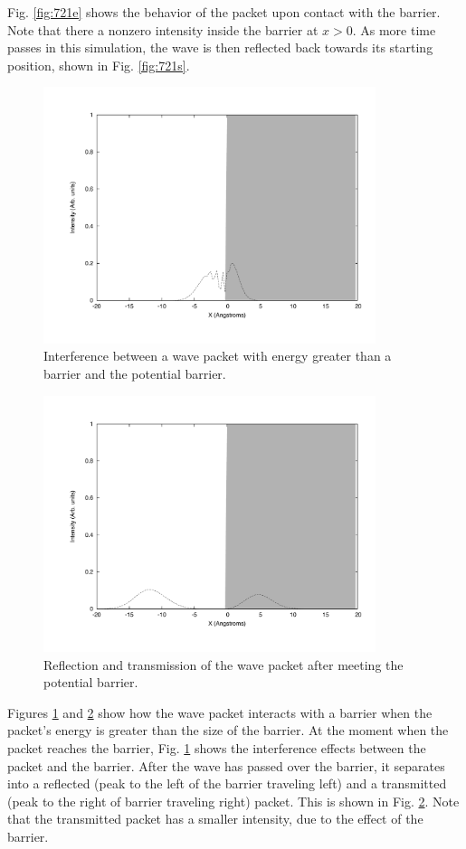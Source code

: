 \documentclass[12pt]{article}
\begin{document}
Fig. \ref{fig:721e} shows the behavior of the packet upon contact with the barrier.  Note that there a nonzero intensity inside the barrier at $x>0$.  As more time passes in this simulation, the wave is then reflected back towards its starting position, shown in Fig. \ref{fig:721s}.

\begin{figure}[!h]
\centering
\includegraphics[width =120 mm, height = 75mm]{Ex_7_23_collis.pdf}
\caption{Interference between a wave packet with energy greater than a barrier and the potential barrier.}
\label{fig:723c}
\end{figure}
\begin{figure}[!h]
\centering
\includegraphics[width =120 mm, height = 75mm]{Ex_7_23_reflec.pdf}
\caption{Reflection and transmission of the wave packet after meeting the potential barrier.}
\label{fig:723r}
\end{figure}

Figures \ref{fig:723c} and \ref{fig:723r} show how the wave packet interacts with a barrier when the packet's energy is greater than the size of the barrier.  At the moment when the packet reaches the barrier, Fig. \ref{fig:723c} shows the interference effects between the packet and the barrier.  After the wave has passed over the barrier, it separates into a reflected (peak to the left of the barrier traveling left) and a transmitted (peak to the right of barrier traveling right) packet.  This is shown in Fig. \ref{fig:723r}.  Note that the transmitted packet has a smaller intensity, due to the effect of the barrier.
\end{document}
